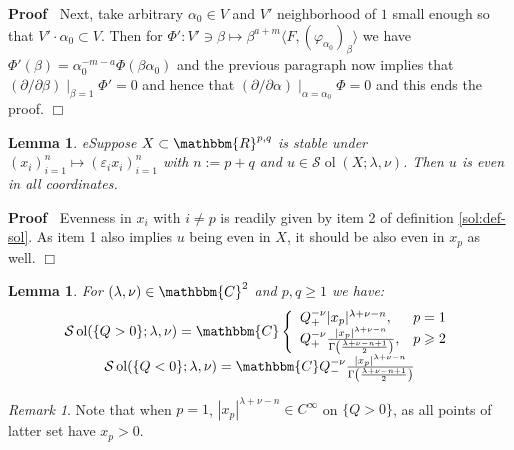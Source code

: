 \documentclass{article}
\newcommand{\assign}{:=}
\newcommand{\tmop}[1]{\ensuremath{\operatorname{#1}}}
\renewenvironment{proof}{\noindent\textbf{Proof\ }}{\hspace*{\fill}$\Box$\medskip}
\newtheorem{lemma}[proposition]{Lemma}
\theoremstyle{remark}
\newtheorem{remark}[proposition]{Remark}
\begin{document}
\begin{proof}
  Next, take arbitrary $\alpha_0 \in V$ and $V'$ neighborhood of $1$ small
  enough so that $V' \cdot \alpha_0 \subset V$. Then for $\Phi' : V' \ni \beta
  \mapsto \beta^{a + m} \langle F, (\varphi_{\alpha_0})_{\beta} \rangle$ we
  have $\Phi' (\beta) = \alpha_0^{- m - a} \Phi (\beta \alpha_0)$ and the
  previous paragraph now implies that $(\partial / \partial \beta)
  \mid_{\beta = 1} \Phi' = 0$ and hence that $(\partial / \partial \alpha)
  \mid_{\alpha = \alpha_0} \Phi = 0$ and this ends the proof.
\end{proof}

\begin{lemma}
  \label{lem67:lem-eveninall}eSuppose $X \subset \mathbbm{R}^{p, q}$ is stable
  under $(x_i)_{i = 1}^n \mapsto (\varepsilon_i x_i)_{i = 1}^n$ with $n
  \assign p + q$ and $u \in \mathcal{S} \tmop{ol} (X ; \lambda, \nu)$. Then
  $u$ is even in all coordinates.
\end{lemma}

\begin{proof}
  Evenness in $x_i$ with $i \neq p$ is readily given by item 2 of definition
  \ref{sol:def-sol}. As item 1 also implies $u$ being even in $X$, it should
  be also even in $x_p$ as well.
\end{proof}

\begin{lemma}
  \label{lem67:lem-Qpm}For $(\lambda, \nu) \in \mathbbm{C}^2$ and $p, q
  \geqslant 1$ we have:
  \[ \begin{array}{c}
       \mathcal{S} \tmop{ol} (\{ Q > 0 \} ; \lambda, \nu) =\mathbbm{C} \left\{
       \begin{array}{ll}
         Q_+^{- \nu} | x_p |^{\lambda + \nu - n}, & p = 1\\
         Q_+^{- \nu} \frac{| x_p |^{\lambda + \nu - n}}{\Gamma \left(
         \frac{\lambda + \nu - n + 1}{2} \right)}, & p \geqslant 2
       \end{array} \right.\\
       \mathcal{S} \tmop{ol} (\{ Q < 0 \} ; \lambda, \nu) =\mathbbm{C}Q_-^{-
       \nu} \frac{| x_p |^{\lambda + \nu - n}}{\Gamma \left( \frac{\lambda +
       \nu - n + 1}{2} \right)}
     \end{array} \]
\end{lemma}

\begin{remark}
  Note that when $p = 1$, $| x_p |^{\lambda + \nu - n} \in C^{\infty}$ on $\{
  Q > 0 \}$, as all points of latter set have $x_p > 0$.
\end{remark}
\end{document}
